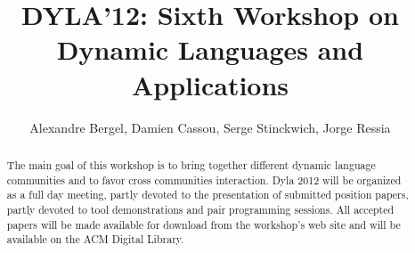 \documentclass[runningheads]{llncs}
\begin{document}
\mainmatter

\title{DYLA'12: Sixth Workshop on Dynamic Languages and Applications}

\author{Alexandre Bergel, Damien Cassou, Serge Stinckwich, Jorge Ressia%
}






\maketitle

\begin{abstract}

The main goal of this workshop is to bring together different dynamic language communities and to favor cross communities interaction. Dyla 2012 will be organized as a full day meeting, partly devoted to the presentation of submitted position papers, partly devoted to tool demonstrations and pair programming sessions.  All accepted papers will be made available for download from the workshop's web site and will be available on the ACM Digital Library.

\end{abstract}
\end{document}
